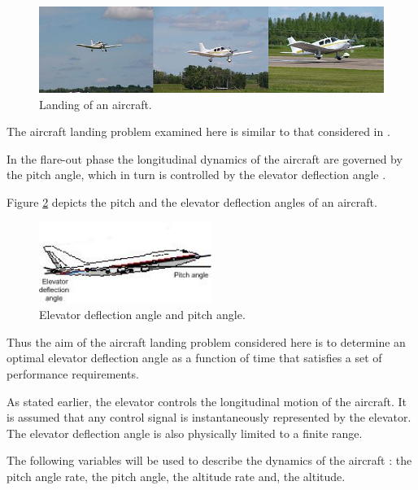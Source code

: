 \begin{figure}[!hbp]
\begin{center}
\includegraphics[width=1.0\textwidth]{optimal_control/aircraft_landing}
\caption{Landing of an aircraft.}\label{AircraftLandingFigure}
\end{center}
\end{figure}

The aircraft landing problem examined here is similar to that considered in \cite{Ellert1963}.

In the flare-out phase the longitudinal dynamics of the aircraft
are governed by the pitch angle, which in turn is controlled by the elevator deflection angle \cite{Ashley1992}. 


Figure \ref{AircraftAngles} depicts the
pitch and the elevator deflection angles of an aircraft.

\begin{figure}[h!]
\begin{center}
\includegraphics[width=0.5\textwidth]{optimal_control/aircraft_angles.jpg}
\caption{Elevator deflection angle and pitch angle.}\label{AircraftAngles}
\end{center}
\end{figure}

Thus the aim of the aircraft landing problem considered here is to
determine an optimal elevator deflection angle as a function of
time that satisfies a set of performance requirements.

As stated earlier, the elevator controls the longitudinal motion
of the aircraft. It is assumed that any control signal is
instantaneously represented by the elevator. The elevator
deflection angle is also physically limited to a finite range.

The following variables will be used to describe the dynamics of the aircraft \cite{Ellert1963}:
the pitch angle rate, the pitch angle, the altitude rate and, the altitude. 

